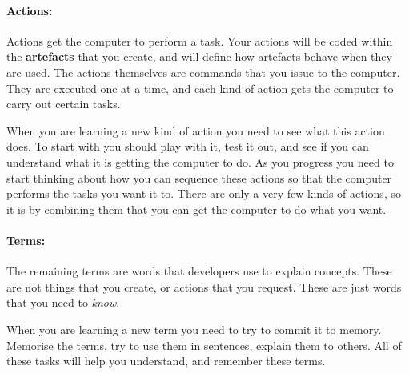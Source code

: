 
\paragraph{Actions:} %
\label{par:actions}

Actions get the computer to perform a task. Your actions will be coded within the \textbf{artefacts} that you create, and will define how artefacts behave when they are used. The actions themselves are commands that you issue to the computer. They are executed one at a time, and each kind of action gets the computer to carry out certain tasks.

When you are learning a new kind of action you need to see what this action does. To start with you should play with it, test it out, and see if you can understand what it is getting the computer to do. As you progress you need to start thinking about how you can sequence these actions so that the computer performs the tasks you want it to. There are only a very few kinds of actions, so it is by combining them that you can get the computer to do what you want. 


\paragraph{Terms:} %
\label{par:terms}

The remaining terms are words that developers use to explain concepts. These are not things that you create, or actions that you request. These are just words that you need to \emph{know}.

When you are learning a new term you need to try to commit it to memory. Memorise the terms, try to use them in sentences, explain them to others. All of these tasks will help you understand, and remember these terms.


